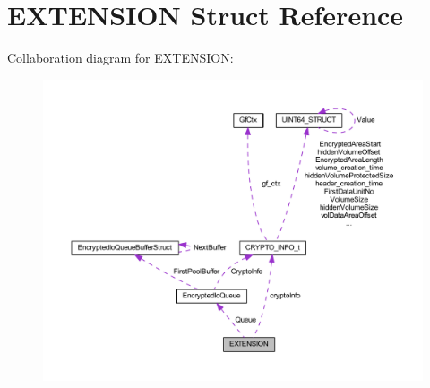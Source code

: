 \hypertarget{struct_e_x_t_e_n_s_i_o_n}{}\section{E\+X\+T\+E\+N\+S\+I\+ON Struct Reference}
\label{struct_e_x_t_e_n_s_i_o_n}


Collaboration diagram for E\+X\+T\+E\+N\+S\+I\+ON\+:
\nopagebreak
\begin{figure}[H]
\begin{center}
\leavevmode
\includegraphics[width=350pt]{struct_e_x_t_e_n_s_i_o_n__coll__graph}
\end{center}
\end{figure}
